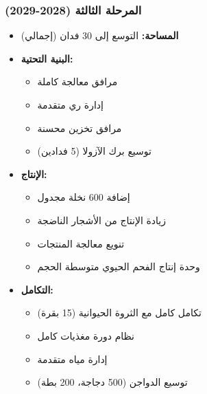 \subsubsection{المرحلة الثالثة (2028-2029)}
\begin{itemize}
    \item \textbf{المساحة:} التوسع إلى 30 فدان (إجمالي)
    \item \textbf{البنية التحتية:}
    \begin{itemize}
        \item مرافق معالجة كاملة
        \item إدارة ري متقدمة
        \item مرافق تخزين محسنة
        \item توسيع برك الآزولا (5 فدادين)
    \end{itemize}
    \item \textbf{الإنتاج:}
    \begin{itemize}
        \item إضافة 600 نخلة مجدول
        \item زيادة الإنتاج من الأشجار الناضجة
        \item تنويع معالجة المنتجات
        \item وحدة إنتاج الفحم الحيوي متوسطة الحجم
    \end{itemize}
    \item \textbf{التكامل:}
    \begin{itemize}
        \item تكامل كامل مع الثروة الحيوانية (15 بقرة)
        \item نظام دورة مغذيات كامل
        \item إدارة مياه متقدمة
        \item توسيع الدواجن (500 دجاجة، 200 بطة)
    \end{itemize}
\end{itemize}

